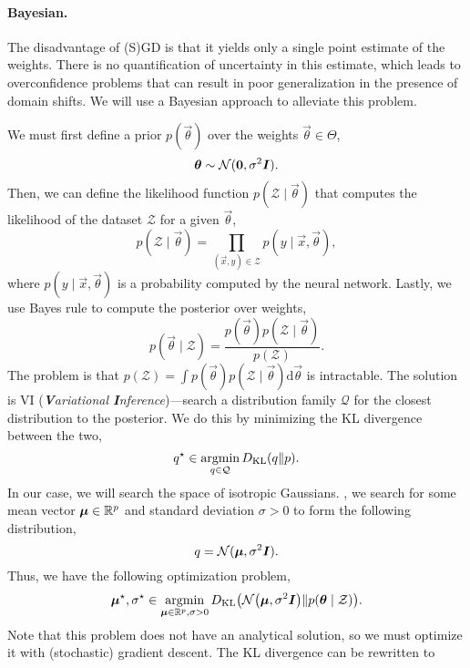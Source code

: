 \paragraph{Bayesian.}

The disadvantage of (S)GD is that it yields only a single point estimate of the weights. There is
no quantification of uncertainty in this estimate, which leads to overconfidence problems that can
result in poor generalization in the presence of domain shifts. We will use a Bayesian approach to
alleviate this problem.


We must first define a prior $p(\vec{\theta})$ over the weights $\vec{\theta} \in \Theta$, \[
    \bm{\theta} \sim \mathcal{N}(\bm{0}, \sigma^2 \bm{I}).
\]
Then, we can define the likelihood function $p(\mathcal{Z} \mid \vec{\theta})$ that computes the
likelihood of the dataset $\mathcal{Z}$ for a given $\vec{\theta}$, \[
    p(\mathcal{Z} \mid \vec{\theta}) = \prod_{(\vec{x}, y) \in \mathcal{Z}} p(y \mid \vec{x}, \vec{\theta}),
\]
where $p(y\mid \vec{x}, \vec{\theta})$ is a probability computed by the neural network. Lastly, we
use Bayes rule to compute the posterior over weights, \[
    p(\vec{\theta} \mid \mathcal{Z}) = \frac{p(\vec{\theta}) p(\mathcal{Z} \mid \vec{\theta})}{p(\mathcal{Z})}.
\]
The problem is that $p(\mathcal{Z}) = \int p(\vec{\theta}) p(\mathcal{Z} \mid \vec{\theta})
    \mathrm{d}\vec{\theta}$ is intractable. The solution is VI (\textit{\textbf{V}ariational
    \textbf{I}nference})---search a distribution family $\mathcal{Q}$ for the closest distribution to
the posterior. We do this by
minimizing the KL divergence between the two, \[
    q^\star \in \operatorname*{argmin}_{q \in \mathcal{Q}} D_{\mathrm{KL}}(q \| p).
\]
In our case, we will search the space of isotropic Gaussians. \Ie, we search for some mean vector
$\bm{\mu} \in \mathbb{R}^p$ and standard deviation $\sigma > 0$ to form the following distribution, \[
    q = \mathcal{N}(\bm{\mu}, \sigma^2 \bm{I}).
\]
Thus, we have the following optimization problem, \[
    \vec{\mu}^\star, \sigma^\star \in \argmin_{\vec{\mu} \in \R^p, \sigma > 0} D_{\mathrm{KL}}\lft(\mathcal{N}\lft(\vec{\mu}, \sigma^2 \mat{I}\rgt) \| p(\vec{\theta} \mid \mathcal{Z})\rgt).
\]
Note that this problem does not have an analytical solution, so we must optimize it with
(stochastic) gradient descent. The KL divergence can be rewritten to
